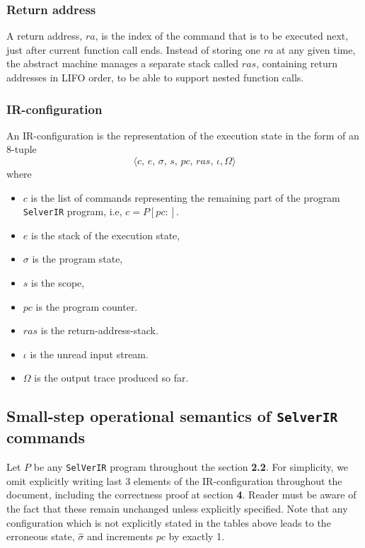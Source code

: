 \documentclass{article}
\begin{document}
\subsubsection{Return address}
A return address, $ra$, is the index of the command that is to be executed next, just after current function call ends. Instead of storing one $ra$ at any given time, the abstract machine manages a separate stack called $ras$, containing return addresses in LIFO order, to be able to support nested function calls.

\subsubsection{IR-configuration}
An IR-configuration is the representation of the execution state in the form of an 8-tuple 
\[
    \langle c,\, e,\, \sigma,\, s,\, pc,\, ras,\, \iota, \Omega \rangle
\] where
\begin{itemize}
    \item $c$ is the list of commands representing the remaining part of the program \texttt{SelverIR} program, i.e, $c = P[pc:]$.

    \item $e$ is the stack of the execution state,

    \item $\sigma$ is the program state,

    \item $s$ is the scope,

    \item $pc$ is the program counter.

    \item $ras$ is the return-address-stack.

    \item $\iota$ is the unread input stream.

    \item $\Omega$ is the output trace produced so far.
    
\end{itemize}


\subsection{Small-step operational semantics of \texttt{SelverIR} commands}
Let $P$ be any \texttt{SelVerIR} program throughout the section \textbf{2.2}. For simplicity, we omit explicitly writing last 3 elements of the IR-configuration throughout the document, including the correctness proof at section \textbf{4}. Reader must be aware of the fact that these remain unchanged unless explicitly specified. Note that any configuration which is not explicitly stated in the tables above leads to the erroneous state, $\hat{\sigma}$ and increments $pc$ by exactly 1.
\end{document}
